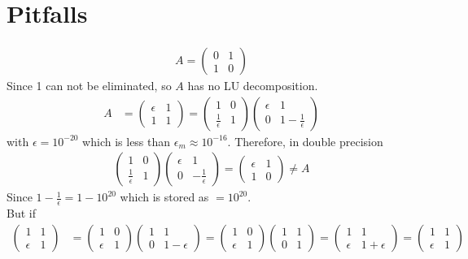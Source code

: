 \documentclass[11pt,oneside]{book}
\theoremstyle{break}
\theoremstyle{break}
\begin{document}
\section[Pitfalls]{Pitfalls}
\begin{align*}
A=\begin{pmatrix}
0&1\\
1&0
\end{pmatrix}
\end{align*}
Since 1 can not be eliminated, so $A$ has no LU decomposition.
\begin{align*}
A&=\begin{pmatrix}
\epsilon &1\\
1&1
\end{pmatrix}=\begin{pmatrix}
1&0\\
\frac{1}{\epsilon}&1
\end{pmatrix}\begin{pmatrix}
\epsilon &1\\
0&1-\frac{1}{\epsilon}
\end{pmatrix}
\end{align*}
with $\epsilon =10^{-20}$ which is less than $\epsilon_m\approx 10^{-16}$. Therefore, in double precision \begin{align*}
\begin{pmatrix}
1&0\\
\frac{1}{\epsilon}&1
\end{pmatrix}\begin{pmatrix}
\epsilon &1\\
0&-\frac{1}{\epsilon}
\end{pmatrix}=\begin{pmatrix}
\epsilon &1\\
1&0
\end{pmatrix}\neq A
\end{align*}
Since $1-\frac{1}{\epsilon}=1-10^{20}$ which is stored as $=10^{20}$.\\
But if \begin{align*}
\begin{pmatrix}
1&1\\
\epsilon &1
\end{pmatrix}&=\begin{pmatrix}
1&0\\
\epsilon&1
\end{pmatrix}\begin{pmatrix}
1&1\\
0&1-\epsilon
\end{pmatrix}=\begin{pmatrix}
1&0\\
\epsilon&1
\end{pmatrix}\begin{pmatrix}
1&1\\
0&1
\end{pmatrix}=\begin{pmatrix}
1&1\\
\epsilon &1+\epsilon
\end{pmatrix}=\begin{pmatrix}
1&1\\
\epsilon&1
\end{pmatrix}
\end{align*}
\end{document}
